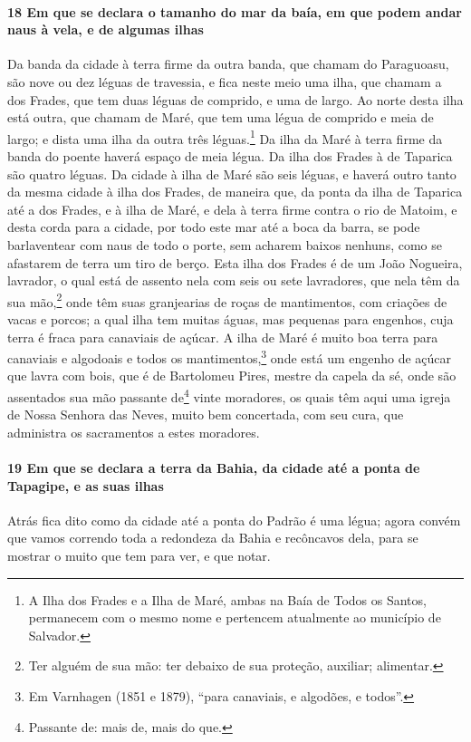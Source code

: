\begin{linenumbers}
\paragraph{18 Em que se declara o tamanho do mar da baía, em que podem andar naus à vela,
e de algumas ilhas}\quad
Da banda da cidade à terra firme da outra banda, que chamam do Paraguoasu, são nove ou dez
léguas de travessia, e fica neste meio uma ilha, que chamam a dos Frades, que tem duas
léguas de comprido, e uma de largo. Ao norte desta ilha está outra, que chamam de Maré,
que tem uma légua de comprido e meia de largo; e dista uma ilha da outra três
léguas.\footnote{ A Ilha dos Frades e a Ilha de Maré, ambas na Baía de Todos os Santos,
permanecem com o mesmo nome e pertencem atualmente ao município de Salvador.} Da ilha da
Maré à terra firme da banda do poente haverá espaço de meia légua. Da ilha dos Frades à de
Taparica são quatro léguas. Da cidade à ilha de Maré são seis léguas, e haverá outro tanto
da mesma cidade à ilha dos Frades, de maneira que, da ponta da ilha de Taparica até a dos
Frades, e à ilha de Maré, e dela à terra firme contra o rio de Matoim, e desta corda para
a cidade, por todo este mar até a boca da barra, se pode barlaventear com naus de todo o
porte, sem acharem baixos nenhuns, como se afastarem de terra um tiro de berço. Esta ilha
dos Frades é de um João Nogueira, lavrador, o qual está de assento nela com seis ou sete
lavradores, que nela têm da sua mão,\footnote{ Ter alguém de sua mão: ter debaixo de sua
proteção, auxiliar; alimentar.} onde têm suas granjearias de roças de mantimentos, com
criações de vacas e porcos; a qual ilha tem muitas águas, mas pequenas para engenhos, cuja
terra é fraca para canaviais de açúcar. A ilha de Maré é muito boa terra para canaviais e
algodoais e todos os mantimentos,\footnote{ Em Varnhagen (1851 e 1879), ``para canaviais,
e algodões, e todos''.} onde está um engenho de açúcar que lavra com bois, que é de
Bartolomeu Pires, mestre da capela da sé, onde são assentados sua mão passante
de\footnote{ Passante de: mais de, mais do que.} vinte moradores, os quais têm aqui uma
igreja de Nossa Senhora das Neves, muito bem concertada, com seu cura, que administra os
sacramentos a estes moradores.

\paragraph{19 Em que se declara a terra da Bahia, da cidade até a ponta de Tapagipe, e as
suas ilhas}\quad
Atrás fica dito como da cidade até a ponta do Padrão é uma légua; agora convém que vamos
correndo toda a redondeza da Bahia e recôncavos dela, para se mostrar o muito que tem para
ver, e que notar.


\end{linenumbers}
